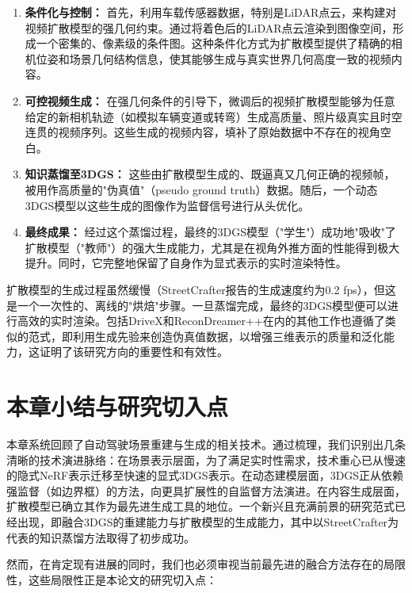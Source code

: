 \begin{enumerate}
\item \textbf{条件化与控制：} 首先，利用车载传感器数据，特别是LiDAR点云，来构建对视频扩散模型的强几何约束。通过将着色后的LiDAR点云渲染到图像空间，形成一个密集的、像素级的条件图。这种条件化方式为扩散模型提供了精确的相机位姿和场景几何结构信息，使其能够生成与真实世界几何高度一致的视频内容\cite{yan2024street}。

\item \textbf{可控视频生成：} 在强几何条件的引导下，微调后的视频扩散模型能够为任意给定的新相机轨迹（如模拟车辆变道或转弯）生成高质量、照片级真实且时空连贯的视频序列\cite{yan2024street}。这些生成的视频内容，填补了原始数据中不存在的视角空白。

\item \textbf{知识蒸馏至3DGS：} 这些由扩散模型生成的、既逼真又几何正确的视频帧，被用作高质量的"伪真值"（pseudo ground truth）数据。随后，一个动态3DGS模型以这些生成的图像作为监督信号进行从头优化\cite{yan2024street}。

\item \textbf{最终成果：} 经过这个蒸馏过程，最终的3DGS模型（"学生"）成功地"吸收"了扩散模型（"教师"）的强大生成能力，尤其是在视角外推方面的性能得到极大提升。同时，它完整地保留了自身作为显式表示的实时渲染特性\cite{yan2024street}。
\end{enumerate}

扩散模型的生成过程虽然缓慢（StreetCrafter报告的生成速度约为0.2 fps\cite{yan2025streetcrafter}），但这是一个一次性的、离线的"烘焙"步骤。一旦蒸馏完成，最终的3DGS模型便可以进行高效的实时渲染。包括DriveX和ReconDreamer++在内的其他工作也遵循了类似的范式，即利用生成先验来创造伪真值数据，以增强三维表示的质量和泛化能力，这证明了该研究方向的重要性和有效性\cite{shi2025drivex}。

\section{本章小结与研究切入点}

本章系统回顾了自动驾驶场景重建与生成的相关技术。通过梳理，我们识别出几条清晰的技术演进脉络：在场景表示层面，为了满足实时性需求，技术重心已从慢速的隐式NeRF表示迁移至快速的显式3DGS表示。在动态建模层面，3DGS正从依赖强监督（如边界框）的方法，向更具扩展性的自监督方法演进。在内容生成层面，扩散模型已确立其作为最先进生成工具的地位。一个新兴且充满前景的研究范式已经出现，即融合3DGS的重建能力与扩散模型的生成能力，其中以StreetCrafter为代表的知识蒸馏方法取得了初步成功。

然而，在肯定现有进展的同时，我们也必须审视当前最先进的融合方法存在的局限性，这些局限性正是本论文的研究切入点：

